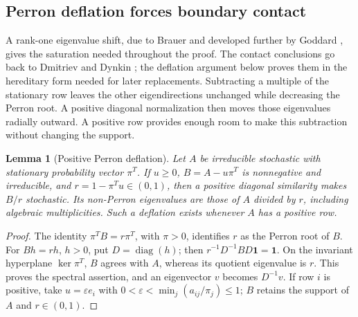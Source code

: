 \documentclass[11pt,a4paper]{article}
\newtheorem{lemma}[theorem]{Lemma}
\theoremstyle{definition}
\theoremstyle{remark}
\numberwithin{equation}{section}
\begin{document}
\subsection{Perron deflation forces boundary contact}
A rank-one eigenvalue shift, due to Brauer \cite{Brauer} and developed further by Goddard \cite{Goddard}, gives the saturation needed throughout the proof. The contact conclusions go back to Dmitriev and Dynkin \cite[\S\S1--2]{DD}; the deflation argument below proves them in the hereditary form needed for later replacements. Subtracting a multiple of the stationary row leaves the other eigendirections unchanged while decreasing the Perron root. A positive diagonal normalization then moves those eigenvalues radially outward. A positive row provides enough room to make this subtraction without changing the support.

\begin{lemma}[Positive Perron deflation]\label{lem:perron-deflation}
Let $A$ be irreducible stochastic with stationary probability vector $\pi^T$.
If $u\ge0$, $B=A-u\pi^T$ is nonnegative and irreducible, and $r=1-\pi^Tu\in(0,1)$, then a positive diagonal similarity makes $B/r$ stochastic.
Its non-Perron eigenvalues are those of $A$ divided by $r$, including algebraic multiplicities.
Such a deflation exists whenever $A$ has a positive row.
\end{lemma}
\begin{proof}
The identity $\pi^TB=r\pi^T$, with $\pi>0$, identifies $r$ as the Perron root of $B$.
For $Bh=rh$, $h>0$, put $D=\operatorname{diag}(h)$; then $r^{-1}D^{-1}BD\mathbf1=\mathbf1$.
On the invariant hyperplane $\ker\pi^T$, $B$ agrees with $A$, whereas its quotient eigenvalue is $r$.
This proves the spectral assertion, and an eigenvector $v$ becomes $D^{-1}v$.
If row $i$ is positive, take $u=\varepsilon e_i$ with
$0<\varepsilon<\min_j(a_{ij}/\pi_j)\le1$; $B$ retains the support of $A$ and $r\in(0,1)$.
\end{proof}
\end{document}
